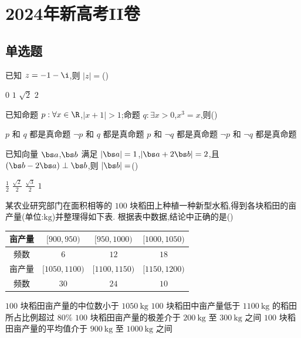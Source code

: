\chapter{2024年新高考II卷}

\section{单选题}

\begin{problem}
已知 \(z=-1-\i\),则 \(|z|=\)(\quad)

\choices
    {\(0\)}
    {\(1\)}
    {\(\sqrt2\)}
    {\(2\)}
\end{problem}

\begin{problem}
已知命题 \(p:\forall x\in\R\),\(|x+1|>1\);命题 \(q:\exists x>0\),\(x^3=x\),则(\quad)

\choices
    {\(p\) 和 \(q\) 都是真命题}
    {\(\neg p\) 和 \(q\) 都是真命题}
    {\(p\) 和 \(\neg q\) 都是真命题}
    {\(\neg p\) 和 \(\neg q\) 都是真命题}
\end{problem}

\begin{problem}
已知向量 \(\bs a\),\(\bs b\) 满足 \(|\bs a|=1\),\(|\bs a+2\bs b|=2\),且 \((\bs b-2\bs a)\perp \bs b\),则 \(|\bs b|=\)(\quad)

\choices
    {\(\frac12\)}
    {\(\frac{\sqrt2}{2}\)}
    {\(\frac{\sqrt3}{2}\)}
    {\(1\)}
\end{problem}

\begin{problem}
某农业研究部门在面积相等的 \(100\text{ 块}\)稻田上种植一种新型水稻,得到各块稻田的亩产量(单位:\(\mathrm{kg}\))并整理得如下表. 根据表中数据,结论中正确的是(\quad)

\begin{center}
\begin{tabular}{|c|c|c|c|}
\hline
亩产量 & \([900,950)\) & \([950,1000)\) & \([1000,1050)\) \\
\hline
频数 & \(6\) & \(12\) & \(18\) \\
\hline
亩产量 & \([1050,1100)\) & \([1100,1150)\) & \([1150,1200)\) \\
\hline
频数 & \(30\) & \(24\) & \(10\) \\
\hline
\end{tabular}
\end{center}

\choices
    {\(100\text{ 块}\)稻田亩产量的中位数小于 \(1050 \mathrm{~kg}\)}
    {\(100\text{ 块}\)稻田中亩产量低于 \(1100 \mathrm{~kg}\) 的稻田所占比例超过 \(80\%\)}
    {\(100\text{ 块}\)稻田亩产量的极差介于 \(200 \mathrm{~kg}\) 至 \(300 \mathrm{~kg}\) 之间}
    {\(100\text{ 块}\)稻田亩产量的平均值介于 \(900 \mathrm{~kg}\) 至 \(1000 \mathrm{~kg}\) 之间}
\end{problem}


